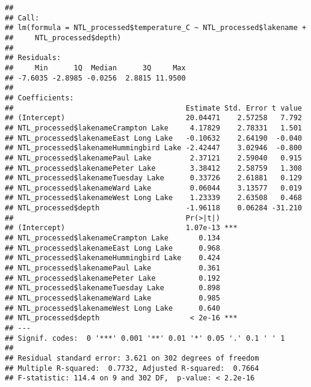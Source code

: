 \documentclass[]{article}
\newenvironment{Shaded}{\begin{snugshade}}{\end{snugshade}}
\newcommand{\KeywordTok}[1]{\textcolor[rgb]{0.13,0.29,0.53}{\textbf{#1}}}
\newcommand{\DecValTok}[1]{\textcolor[rgb]{0.00,0.00,0.81}{#1}}
\newcommand{\StringTok}[1]{\textcolor[rgb]{0.31,0.60,0.02}{#1}}
\newcommand{\OperatorTok}[1]{\textcolor[rgb]{0.81,0.36,0.00}{\textbf{#1}}}
\newcommand{\NormalTok}[1]{#1}
\begin{document}
\begin{Shaded}
\end{Shaded}

\begin{verbatim}
## 
## Call:
## lm(formula = NTL_processed$temperature_C ~ NTL_processed$lakename + 
##     NTL_processed$depth)
## 
## Residuals:
##     Min      1Q  Median      3Q     Max 
## -7.6035 -2.8985 -0.0256  2.8815 11.9500 
## 
## Coefficients:
##                                        Estimate Std. Error t value
## (Intercept)                            20.04471    2.57258   7.792
## NTL_processed$lakenameCrampton Lake     4.17829    2.78331   1.501
## NTL_processed$lakenameEast Long Lake   -0.10632    2.64190  -0.040
## NTL_processed$lakenameHummingbird Lake -2.42447    3.02946  -0.800
## NTL_processed$lakenamePaul Lake         2.37121    2.59040   0.915
## NTL_processed$lakenamePeter Lake        3.38412    2.58759   1.308
## NTL_processed$lakenameTuesday Lake      0.33726    2.61881   0.129
## NTL_processed$lakenameWard Lake         0.06044    3.13577   0.019
## NTL_processed$lakenameWest Long Lake    1.23339    2.63508   0.468
## NTL_processed$depth                    -1.96118    0.06284 -31.210
##                                        Pr(>|t|)    
## (Intercept)                            1.07e-13 ***
## NTL_processed$lakenameCrampton Lake       0.134    
## NTL_processed$lakenameEast Long Lake      0.968    
## NTL_processed$lakenameHummingbird Lake    0.424    
## NTL_processed$lakenamePaul Lake           0.361    
## NTL_processed$lakenamePeter Lake          0.192    
## NTL_processed$lakenameTuesday Lake        0.898    
## NTL_processed$lakenameWard Lake           0.985    
## NTL_processed$lakenameWest Long Lake      0.640    
## NTL_processed$depth                     < 2e-16 ***
## ---
## Signif. codes:  0 '***' 0.001 '**' 0.01 '*' 0.05 '.' 0.1 ' ' 1
## 
## Residual standard error: 3.621 on 302 degrees of freedom
## Multiple R-squared:  0.7732, Adjusted R-squared:  0.7664 
## F-statistic: 114.4 on 9 and 302 DF,  p-value: < 2.2e-16
\end{verbatim}
\end{document}
